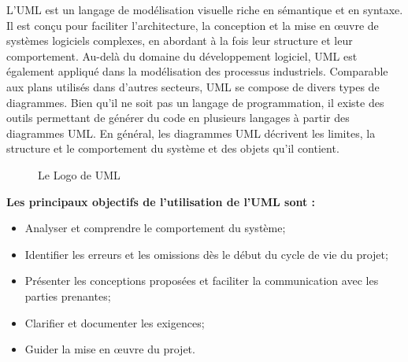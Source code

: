 L'UML \cite{b24}est un langage de modélisation visuelle riche en sémantique et en syntaxe. Il est conçu pour faciliter l'architecture, la conception et la mise en œuvre de systèmes logiciels complexes, en abordant à la fois leur structure et leur comportement. Au-delà du domaine du développement logiciel, UML est également appliqué dans la modélisation des processus industriels. Comparable aux plans utilisés dans d'autres secteurs, UML se compose de divers types de diagrammes. Bien qu'il ne soit pas un langage de programmation, il existe des outils permettant de générer du code en plusieurs langages à partir des diagrammes UML. En général, les diagrammes UML décrivent les limites, la structure et le comportement du système et des objets qu'il contient.

\begin{figure}[H]
\centering
{}
\caption{Le Logo de UML}
\end{figure}

\textbf{Les principaux objectifs de l'utilisation de l'UML sont :}
\begin{itemize}
    \item Analyser et comprendre le comportement du système;
    \item Identifier les erreurs et les omissions dès le début du cycle de vie du projet;
    \item Présenter les conceptions proposées et faciliter la communication avec les parties prenantes;
    \item Clarifier et documenter les exigences;
    \item Guider la mise en œuvre du projet.
\end{itemize}


